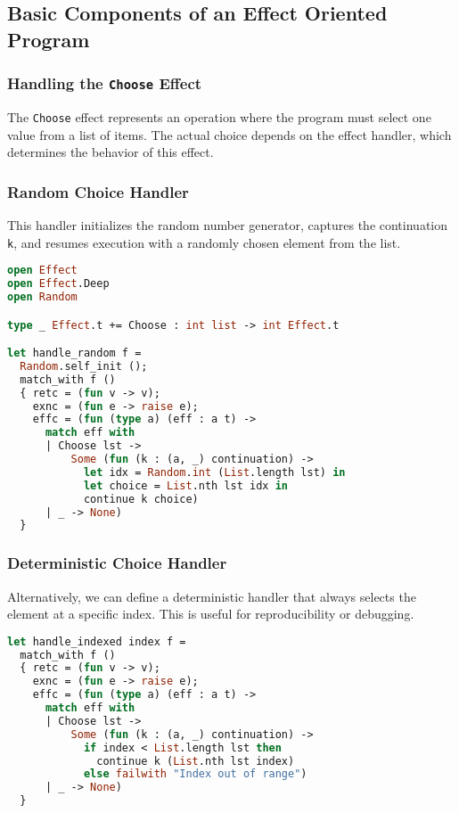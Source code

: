 \documentclass[logo,bsc,singlespacing,parskip,online]{infthesis}
\begin{document}
\subsection{Basic Components of an Effect Oriented Program}


\subsubsection{{Handling the \texttt{Choose} Effect}}

The \texttt{Choose} effect represents an operation where the program must select one value from a list of items. The actual choice depends on the effect handler, which determines the behavior of this effect.

\subsubsection{Random Choice Handler}

This handler initializes the random number generator, captures the continuation \texttt{k}, and resumes execution with a randomly chosen element from the list.


\begin{lstlisting}[language=OCaml]
open Effect
open Effect.Deep
open Random

type _ Effect.t += Choose : int list -> int Effect.t

let handle_random f =
  Random.self_init ();
  match_with f ()
  { retc = (fun v -> v);
    exnc = (fun e -> raise e);
    effc = (fun (type a) (eff : a t) ->
      match eff with
      | Choose lst ->
          Some (fun (k : (a, _) continuation) ->
            let idx = Random.int (List.length lst) in
            let choice = List.nth lst idx in
            continue k choice)
      | _ -> None)
  }
\end{lstlisting}

\subsubsection{Deterministic Choice Handler}

Alternatively, we can define a deterministic handler that always selects the element at a specific index. This is useful for reproducibility or debugging.

\begin{lstlisting}[language=OCaml]
let handle_indexed index f =
  match_with f ()
  { retc = (fun v -> v);
    exnc = (fun e -> raise e);
    effc = (fun (type a) (eff : a t) ->
      match eff with
      | Choose lst ->
          Some (fun (k : (a, _) continuation) ->
            if index < List.length lst then
              continue k (List.nth lst index)
            else failwith "Index out of range")
      | _ -> None)
  }
\end{lstlisting}
\end{document}
